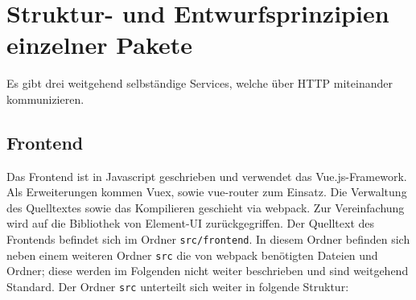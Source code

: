 \documentclass[a4paper,11pt,oneside, titlepage]{article}
\begin{document}
\section{Struktur- und Entwurfsprinzipien einzelner Pakete}
Es gibt drei weitgehend selbständige Services, welche über HTTP miteinander kommunizieren.
\subsection{Frontend}
Das Frontend ist in \gls{Javascript} geschrieben und verwendet das \gls{Vue.js}-Framework. Als Erweiterungen kommen \gls{Vuex}, sowie \gls{vue-router} zum Einsatz. Die Verwaltung des Quelltextes sowie das Kompilieren geschieht via \gls{webpack}. Zur Vereinfachung wird auf die Bibliothek von \gls{Element-UI} zurückgegriffen. Der Quelltext des Frontends befindet sich im Ordner \verb+src/frontend+. In diesem Ordner befinden sich neben einem weiteren Ordner \verb+src+ die von \gls{webpack} benötigten Dateien und Ordner; diese werden im Folgenden nicht weiter beschrieben und sind weitgehend Standard. Der Ordner \verb+src+ unterteilt sich weiter in folgende Struktur:
\newline

\end{document}
